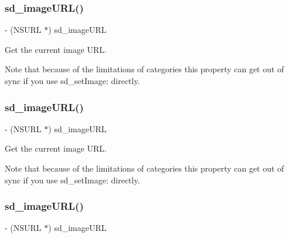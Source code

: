 \subsubsection{\texorpdfstring{sd\+\_\+image\+U\+R\+L()}{sd\_imageURL()}\hspace{0.1cm}{\footnotesize\ttfamily [1/3]}}
{\footnotesize\ttfamily -\/ (N\+S\+U\+RL $\ast$) sd\+\_\+image\+U\+RL \begin{DoxyParamCaption}{ }\end{DoxyParamCaption}}

Get the current image U\+RL.

Note that because of the limitations of categories this property can get out of sync if you use sd\+\_\+set\+Image\+: directly. \mbox{\label{category_u_i_image_view_07_web_cache_08_abf2a037e36bc88eb9deeddbccd160755}} 
\subsubsection{\texorpdfstring{sd\+\_\+image\+U\+R\+L()}{sd\_imageURL()}\hspace{0.1cm}{\footnotesize\ttfamily [2/3]}}
{\footnotesize\ttfamily -\/ (N\+S\+U\+RL $\ast$) sd\+\_\+image\+U\+RL \begin{DoxyParamCaption}{ }\end{DoxyParamCaption}}

Get the current image U\+RL.

Note that because of the limitations of categories this property can get out of sync if you use sd\+\_\+set\+Image\+: directly. \mbox{\label{category_u_i_image_view_07_web_cache_08_abf2a037e36bc88eb9deeddbccd160755}} 
\subsubsection{\texorpdfstring{sd\+\_\+image\+U\+R\+L()}{sd\_imageURL()}\hspace{0.1cm}{\footnotesize\ttfamily [3/3]}}
{\footnotesize\ttfamily -\/ (N\+S\+U\+RL $\ast$) sd\+\_\+image\+U\+RL \begin{DoxyParamCaption}{ }\end{DoxyParamCaption}}

